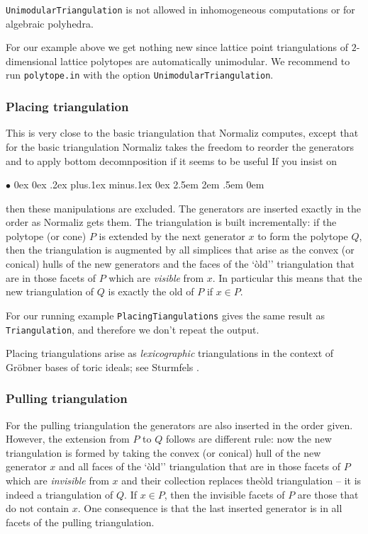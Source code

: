 \documentclass[12pt,a4paper]{scrartcl}
\newcommand{\stdli}{ \topsep0ex \partopsep0ex %
\parsep.2ex plus.1ex minus.1ex \itemsep0ex%
\leftmargin2.5em \labelwidth2em \labelsep.5em \rightmargin0em}%
\renewenvironment{itemize}{\begin{list}{{$\bullet$}}{\stdli}}{\end{list}}
\theoremstyle{definition}
\def\itemtt[#1]{\item[\textbf{\ttt{#1}}]}
\def\ttt{\texttt}
\begin{document}
\ttt{UnimodularTriangulation} is not allowed in inhomogeneous computations or for algebraic polyhedra.

For our example above we get nothing new since lattice point triangulations of $2$-dimensional lattice polytopes are automatically unimodular. We recommend to run \ttt{polytope.in} with the option \ttt{UnimodularTriangulation}.

\subsubsection{Placing triangulation}

This is very close to the basic triangulation that Normaliz computes, except that for the basic triangulation Normaliz takes the freedom to reorder the generators and to apply bottom decomnposition if it seems to be useful If you insist on
\begin{itemize}
	\itemtt[PlacingTriangulation]
\end{itemize}

then these manipulations are excluded. The generators are inserted exactly in the order as Normaliz gets them. The triangulation is built incrementally: if the polytope (or cone) $P$ is extended by the next generator $x$ to form the polytope $Q$, then the triangulation is augmented by all simplices that arise as the convex (or conical) hulls of the new generators and the faces of the `òld'' triangulation that are in those facets of $P$ which are \emph{visible} from $x$. In particular this means that the new triangulation of $Q$ is exactly the old of $P$ if $x\in P$.

For our running example \verb|PlacingTiangulations| gives the same result as \verb|Triangulation|, and therefore we don't repeat the output.

Placing triangulations arise as \emph{lexicographic} triangulations in the context of Gröbner bases of toric ideals; see Sturmfels \cite[p. 67]{Stu}.

\subsubsection{Pulling triangulation}

For the pulling triangulation the generators are also inserted in the order given. However, the extension from $P$ to $Q$ follows are different rule: now the new triangulation is formed by taking the convex (or conical) hull of the new generator $x$ and all  faces of the `òld'' triangulation that are in those facets of $P$ which are \emph{invisible} from $x$ and their collection replaces theòld triangulation -- it is indeed a triangulation of $Q$. If $x\in P$, then the invisible facets of $P$ are those that do not contain $x$. One consequence is that the last inserted generator is in all facets of the pulling triangulation. 
\end{document}

